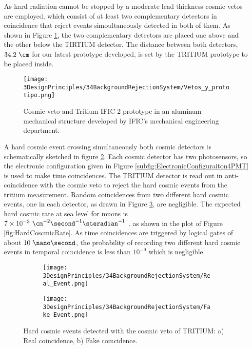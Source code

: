 As hard radiation cannot be stopped by a moderate lead thickness cosmic vetos are employed, which consist of at least two complementary detectors in coincidence that reject events simoultaneously detected in both of them. As shown in Figure \ref{fig:VetoAndPrototype}, the two complementary detectors are placed one above and the other below the TIRTIUM detector. The distance between both detectors, $34.2~\cm$ for our latest prototype developed, is set by the TRITIUM prototype to be placed inside.

\begin{figure}[h]
\centering
\texttt{[image: 3DesignPrinciples/34BackgroundRejectionSystem/Vetos\_y\_prototipo.png]}
\caption{Cosmic veto and Tritium-IFIC 2 prototype in an aluminum mechanical structure developed by IFIC's mechanical engineering department.\label{fig:VetoAndPrototype}}
\end{figure}

A hard cosmic event crossing simultaneously both cosmic detectors is schematically sketched in figure \ref{subfig:RealHardCosmicEvent}. Each cosmic detector has two photosensors, so the electronic configuration given in Figure \ref{subfig:ElectronicConfiguraiton4PMT} is used to make time coincidences. The TRITIUM detector is read out in anti-coincidence with the cosmic veto to reject the hard cosmic events from the tritium measurement. Random coincidences from two different hard cosmic events, one in each detector, as drawn in Figure \ref{subfig:FakeHardCosmicEvent}, are negligible. The expected hard cosmic rate at sea level for muons is $7\times 10^{-3}~\cm^{-2}\second^{-1}\steradian^{-1}$ \cite{PDG, HardCosmicMuonRate}, as shown in the plot of Figure \ref{fig:HardCoscmicRate}. As time coincidences are triggered by logical gates of about $10~\nano\second$, the probability of recording two different hard cosmic events in temporal coincidence is less than $10^{-9}$ which is negligible.

\begin{figure}[h]
\centering
    \begin{subfigure}[b]{0.45\textwidth}
    \centering
    \texttt{[image: 3DesignPrinciples/34BackgroundRejectionSystem/Real\_Event.png]}  
    \caption{\label{subfig:RealHardCosmicEvent}}
    \end{subfigure}
    \hfill
    \begin{subfigure}[b]{0.45\textwidth}
    \centering
    \texttt{[image: 3DesignPrinciples/34BackgroundRejectionSystem/Fake\_Event.png]}  
    \caption{\label{subfig:FakeHardCosmicEvent}}
    \end{subfigure}
   \caption{Hard cosmic events detected with the cosmic veto of TRITIUM: a) Real coincidence, b) Fake coincidence.}
 \label{fig:HardCosmicEventsSimulation}
\end{figure}

